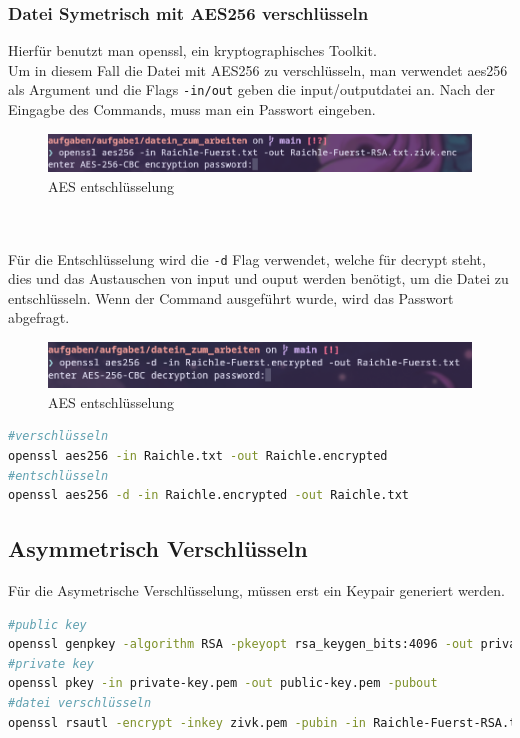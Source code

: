 \documentclass[a4paper]{article}
\begin{document}
\subsubsection{Datei Symetrisch mit AES256 verschlüsseln}
Hierfür benutzt man openssl, ein kryptographisches Toolkit.\cite{openssl-cheatsh}\\
Um in diesem Fall die Datei mit AES256 zu verschlüsseln, man verwendet aes256 als Argument und die Flags \texttt{-in/out} geben die input/outputdatei an. Nach der Eingagbe des Commands, muss man ein Passwort eingeben.
\begin{figure}[h]
	\centering
	\includegraphics[scale=1.5]{images/aes-encrypt.png}
	\caption{AES entschlüsselung}
\end{figure} \\ \\
Für die Entschlüsselung wird die \texttt{-d} Flag verwendet, welche für decrypt steht, dies und das Austauschen von input und ouput werden benötigt, um die Datei zu entschlüsseln. Wenn der Command ausgeführt wurde, wird das Passwort abgefragt.
\begin{figure}[h]
	\centering
	\includegraphics[scale=1.5]{images/aes-decrypt.png}
	\caption{AES entschlüsselung}
\end{figure}
\begin{lstlisting}[language=bash]
#verschlüsseln
openssl aes256 -in Raichle.txt -out Raichle.encrypted
#entschlüsseln
openssl aes256 -d -in Raichle.encrypted -out Raichle.txt
\end{lstlisting}

\subsection{Asymmetrisch Verschlüsseln}
Für die Asymetrische Verschlüsselung, müssen erst ein Keypair generiert werden.
\begin{lstlisting}[language=bash]
#public key
openssl genpkey -algorithm RSA -pkeyopt rsa_keygen_bits:4096 -out private-key.pem
#private key
openssl pkey -in private-key.pem -out public-key.pem -pubout
#datei verschlüsseln
openssl rsautl -encrypt -inkey zivk.pem -pubin -in Raichle-Fuerst-RSA.txt -out Raichle-Fuerst-RSA.txt.zivk.enc
\end{lstlisting}
\end{document}
